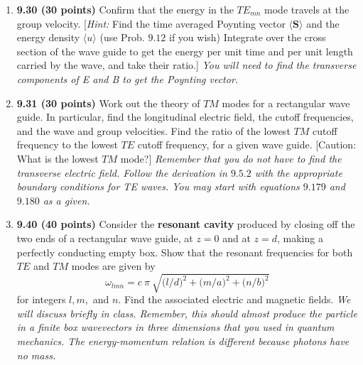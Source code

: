 \documentclass[fleqn]{article}
\begin{document}
  \begin{enumerate}
    \item \textbf{9.30 (30 points)} Confirm that the energy in the $TE_{mn}$ mode travels at the group velocity. [\emph{Hint:} 
    Find the time averaged Poynting vector $\langle \mathbf{S} \rangle$ and the energy density $\langle u \rangle$ 
    (use Prob. $9.12$ if you wish) Integrate over the cross section of the wave guide to get the energy per unit time 
    and per unit length carried by the wave, and take their ratio.] 
    \emph{You will need to find the transverse components of E and B to get the Poynting vector.}



    \item \textbf{9.31 (30 points)} Work out the theory of $TM$ modes for a rectangular wave guide. In particular, find the 
    longitudinal electric field, the cutoff frequencies, and the wave and group velocities. Find the ratio of the lowest 
    $TM$ cutoff frequency to the lowest $TE$ cutoff frequency, for a given wave guide. [Caution: What is the lowest $TM$ mode?]
    \emph{Remember that you do not have to find the transverse electric field.  Follow the derivation in $9.5.2$ with the 
    appropriate boundary conditions for TE waves.  You may start with equations $9.179$ and $9.180$ as a given.}


    \item \textbf{9.40 (40 points)} Consider the \textbf{resonant cavity} produced by closing off the two ends of a rectangular 
    wave guide, at $z=0$ and at $z=d$, making a perfectly conducting empty box. Show that the resonant frequencies for 
    both $TE$ and $TM$ modes are given by
    $$
      \omega_{lmn}=c ~ \pi ~ \sqrt{\bigg(l/d \bigg)^2+\bigg(m/a \bigg)^2+\bigg(n/b \bigg)^2} 
    $$
    for integers $l, m,$ and $n$. Find the associated electric and magnetic fields.
    \emph{We will discuss briefly in class.  Remember, this should almost produce the particle in 
    a finite box wavevectors in three dimensions that you used in quantum mechanics. 
    The energy-momentum relation is different because photons have no mass.}


  \end{enumerate}
\end{document}
